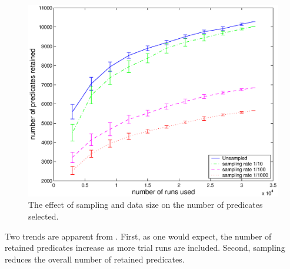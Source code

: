 \begin{figure}
\centering
\includegraphics[width=\columnwidth]{predkept3a}
\caption{The effect of sampling and data size on the number of
  predicates selected.}
\label{fig:predkept}
\end{figure}

Two trends are apparent from .  First, as one would
expect, the number of retained predicates increase as more trial runs are
included.  Second, sampling reduces the overall number of retained predicates.


